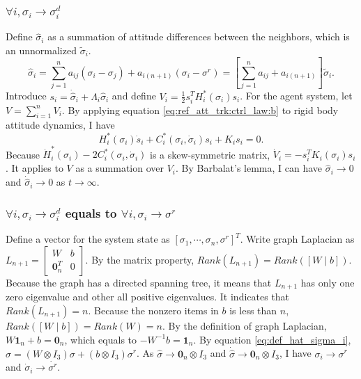 \subsubsection{ $ \forall i, \sigma_{i} \rightarrow \sigma^{d}_{i} $ }
\label{sec:ref_att_trk:proof:a}

Define $ \hat{\sigma}_{i} $ as a summation of attitude differences between the neighbors, which is an unnormalized $ \tilde{\sigma}_{i} $.
\begin{equation}
\label{eq:def_hat_sigma_i}
\hat{\sigma}_{i} = \sum_{j=1}^{n} a_{ij} ( \sigma_{i} - \sigma_{j} ) + a_{i(n+1)} ( \sigma_{i} - \sigma^{r} ) = [ \sum_{j=1}^{n} a_{ij} + a_{i(n+1)} ] \tilde{\sigma}_{i}.
\end{equation} 
Introduce $ s_{i} = \dot{\hat{\sigma}}_{i} + \Lambda_{i} \hat{\sigma}_{i} $
and define $ V_{i} = \frac{1}{2} s^{T}_{i} H^{*}_{i} ( \sigma_{i} ) s_{i} $.
For the agent system, let $ V =  \sum_{i=1}^{n} V_{i} $.
By applying equation \eqref{eq:ref_att_trk:ctrl_law:b} to rigid body attitude dynamics, I have
\begin{equation}
H^{*}_{i} ( \sigma_{i} ) \dot{s}_{i}
+ C^{*}_{i} ( \sigma_{i}, \dot{ \sigma }_{i} ) s_{i} + K_{i} s_{i} = 0.
\end{equation}
Because $ \dot{H}^{*}_{i} ( \sigma_{i} ) - 2 C^{*}_{i} ( \sigma_{i}, \dot{ \sigma }_{i} ) $ is a skew-symmetric matrix,
$ \dot{V}_{i} = - s^{T}_{i} K_{i} ( \sigma_{i} ) s_{i} $.
It applies to $ V $ as a summation over $ V_{i} $.
By Barbalat's lemma, I can have $ \hat{\sigma}_{i} \rightarrow 0 $ and $ \dot{\hat{\sigma}}_{i} \rightarrow 0 $ as $ t \rightarrow \infty $.

\subsubsection{ $ \forall i, \sigma_{i} \rightarrow \sigma^{d}_{i} $ equals to $ \forall i, \sigma_{i} \rightarrow \sigma^{r} $ }
\label{sec:ref_att_trk:proof:b}

Define a vector for the system state as $ [ \sigma_{1} , \cdots , \sigma_{n} , \sigma^{r} ]^{T} $.
Write graph Laplacian as  $ L_{n+1}  =  \begin{bmatrix} W & b \\ \mathbf{0}^{T}_{n} & 0 \end{bmatrix} $.
By the matrix property, $ Rank( L_{n+1} ) = Rank( [W \mid b] ) $.
Because the graph has a directed spanning tree, it means that $ L_{n+1} $ has only one zero eigenvalue and other all positive eigenvalues.
It indicates that $ Rank( L_{n+1} ) = n $.
Because the nonzero items in $ b $ is less than $ n $, $ Rank( [W \mid b] ) = Rank( W ) = n $.
By the definition of graph Laplacian, $ W \mathbf{1}_{n} + b = \mathbf{0}_{n} $, which equals to
$ - W^{-1} b = \mathbf{1}_{n} $.
By equation \eqref{eq:def_hat_sigma_i}, $ \hat{ \sigma } = (W \otimes I_{3}) \sigma + (b \otimes I_{3} ) \sigma^{r} $.
As $ \hat{ \sigma } \rightarrow \mathbf{0}_{n} \otimes I_{3} $ and $ \dot{\hat{\sigma}} \rightarrow \mathbf{0}_{n} \otimes I_{3} $,
I have $ \sigma_{i} \rightarrow \sigma^{r}  $ and $ \dot{\sigma}_{i} \rightarrow \dot{\sigma^{r}} $.

